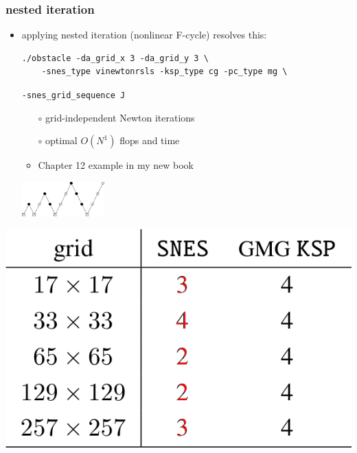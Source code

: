 \documentclass[svgnames,
               hyperref={colorlinks,citecolor=DeepPink4,linkcolor=FireBrick,urlcolor=Maroon},
               usepdftitle=false]  %
               {beamer}
\begin{document}
\begin{frame}[fragile]
\frametitle{nested iteration}

\begin{itemize}
\item applying nested iteration (nonlinear F-cycle) resolves this:

\vspace{2mm}
\begin{Verbatim}[xleftmargin=13mm,fontsize=\scriptsize]
./obstacle -da_grid_x 3 -da_grid_y 3 \
    -snes_type vinewtonrsls -ksp_type cg -pc_type mg \
\end{Verbatim}

\vspace{-1.5mm}
\hspace{18.7mm} {\scriptsize \color{FireBrick} \texttt{-snes\_grid\_sequence J}}

\vspace{2mm}
    \begin{itemize}
    \item[$\circ$] grid-independent Newton iterations
    \item[$\circ$] optimal $O(N^1)$ flops and time
    \item<2>[$\circ$] Chapter 12 example in my new book
    \end{itemize}

\vspace{-12mm}
\hfill \includegraphics[width=0.25\textwidth]{images/mg-fcycle.png}
\end{itemize}

\bigskip
\includegraphics[height=0.25\textheight]{images/vi-newton-gmg-good.png} 


\end{frame}
\end{document}
